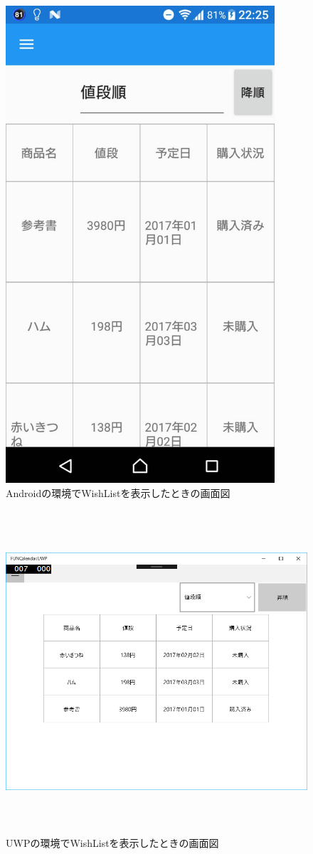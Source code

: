 ﻿\documentclass[a4j]{jarticle}
\begin{document}
\begin{description}
\begin{figure}[htbp]
			\includegraphics[width=100mm]{figures/WishListMainAndroid.jpg}
			\caption{Androidの環境でWishListを表示したときの画面図}
			\label{WishListMainFig1}
		\end{figure}
		\begin{figure}[htbp]
			\centering
			\includegraphics[height=120mm]{figures/WishListMainUWP.png}
			\caption{UWPの環境でWishListを表示したときの画面図}
			\label{WishListMainFig2}
		\end{figure}
		\clearpage


\end{description}
\end{document}
